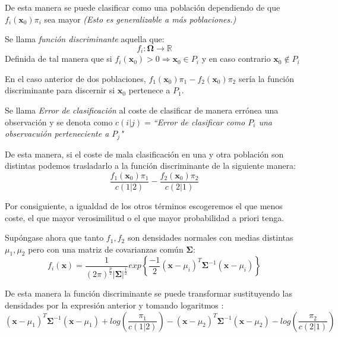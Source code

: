 \noindent De esta manera se puede clasificar como una población dependiendo de que $f_i(\textbf{x}_0)\pi_i$ sea mayor \emph{(Esto es generalizable a más poblaciones.)}

\begin{defi}
Se llama \textit{función discriminante } aquella que:
\begin{equation}
f_i:\mathbf{\Omega}\longrightarrow \mathbb{R}
\end{equation}
Definida de tal manera que si $f_i(\textbf{x}_0)>0\Rightarrow \textbf{x}_0\in P_i$ y en caso contrario $\textbf{x}_0\notin P_i$
\end{defi}

\noindent En el caso anterior de dos poblaciones, $f_1(\textbf{x}_0)\pi_1-f_2(\textbf{x}_0)\pi_2$ sería la función discriminante para discernir si $\textbf{x}_0$ pertenece a $P_1$. 

\begin{defi}
Se llama \emph{Error de clasificación} al coste de clasificar de manera errónea una observación y se denota como $c(i|j)=$\emph{``Error de clasificar como $P_i$ una observacuión perteneciente a $P_j$"}
\end{defi}

\noindent De esta manera, si el coste de mala clasificación en una y otra población son distintas podemos trasladarlo a la función discriminante de la siguiente manera:
\begin{equation}
\dfrac{f_1(\textbf{x}_0)\pi_1}{c(1|2)}-\dfrac{f_2(\textbf{x}_0)\pi_2}{c(2|1)}
\end{equation}

\noindent Por consiguiente, a igualdad de los otros términos escogeremos el que menos coste, el que mayor verosimilitud  o el que mayor probabilidad a priori tenga.

\noindent Supóngase ahora que tanto $f_1,f_2$ son densidades normales con medias distintas $\mu_1,\mu_2$ pero con una matriz de covarianzas común $\mathbf{\Sigma}$:
\begin{equation}
f_i(\textbf{x})=\dfrac{1}{(2\pi)^{\frac{p}{2}}|\mathbf{\Sigma}|^{\frac{1}{2}}} exp \left\lbrace\dfrac{-1}{2}(\textbf{x}-\mu_i)^T \mathbf{\Sigma}^{-1}(\textbf{x}-\mu_i) \right\rbrace
\end{equation}

\noindent De esta manera la función discriminante se puede transformar sustituyendo las densidades por la expresión anterior y tomando logaritmos : 
\begin{equation}
(\textbf{x}-\mu_1)^T \mathbf{\Sigma}^{-1}(\textbf{x}-\mu_1)+log\left(\dfrac{\pi_1}{c(1|2)}\right)-(\textbf{x}-\mu_2)^T \mathbf{\Sigma}^{-1} (\textbf{x}-\mu_2)-log\left(\dfrac{\pi_2}{c(2|1)}\right)
\end{equation}

